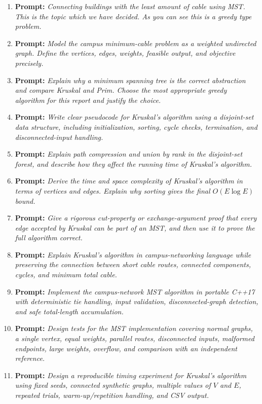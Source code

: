 \documentclass[conference]{IEEEtran}
\begin{document}
\begin{enumerate}
\item \textbf{Prompt:} \emph{Connecting buildings with the least amount of cable using MST. This is the topic which we have decided. As you can see this is a greedy type problem.}
\item \textbf{Prompt:} \emph{Model the campus minimum-cable problem as a weighted undirected graph. Define the vertices, edges, weights, feasible output, and objective precisely.}
\item \textbf{Prompt:} \emph{Explain why a minimum spanning tree is the correct abstraction and compare Kruskal and Prim. Choose the most appropriate greedy algorithm for this report and justify the choice.}
\item \textbf{Prompt:} \emph{Write clear pseudocode for Kruskal's algorithm using a disjoint-set data structure, including initialization, sorting, cycle checks, termination, and disconnected-input handling.}
\item \textbf{Prompt:} \emph{Explain path compression and union by rank in the disjoint-set forest, and describe how they affect the running time of Kruskal's algorithm.}
\item \textbf{Prompt:} \emph{Derive the time and space complexity of Kruskal's algorithm in terms of vertices and edges. Explain why sorting gives the final $O(E\log E)$ bound.}
\item \textbf{Prompt:} \emph{Give a rigorous cut-property or exchange-argument proof that every edge accepted by Kruskal can be part of an MST, and then use it to prove the full algorithm correct.}
\item \textbf{Prompt:} \emph{Explain Kruskal's algorithm in campus-networking language while preserving the connection between short cable routes, connected components, cycles, and minimum total cable.}
\item \textbf{Prompt:} \emph{Implement the campus-network MST algorithm in portable C++17 with deterministic tie handling, input validation, disconnected-graph detection, and safe total-length accumulation.}
\item \textbf{Prompt:} \emph{Design tests for the MST implementation covering normal graphs, a single vertex, equal weights, parallel routes, disconnected inputs, malformed endpoints, large weights, overflow, and comparison with an independent reference.}
\item \textbf{Prompt:} \emph{Design a reproducible timing experiment for Kruskal's algorithm using fixed seeds, connected synthetic graphs, multiple values of $V$ and $E$, repeated trials, warm-up/repetition handling, and CSV output.}

\end{enumerate}
\end{document}
